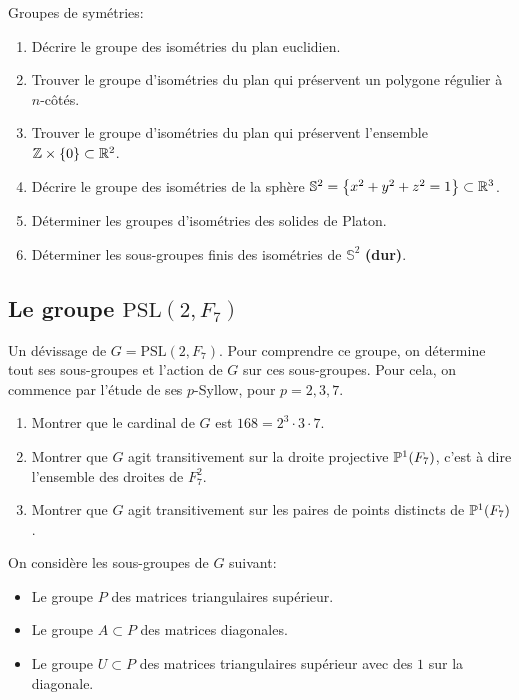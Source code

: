 Groupes de symétries:
\begin{enumerate}
	\item Décrire le groupe des isométries du plan euclidien.
	\item Trouver le groupe d'isométries du plan qui
		préservent un polygone régulier à
		$ n $-côtés.
	\item Trouver le groupe d'isométries du plan qui
		préservent l'ensemble
		$ \mathbb{Z} \times \left\{ 0 \right\} \subset \mathbb{R}^2 $.
	\item Décrire le groupe des isométries de la sphère
		$ \mathbb{S}^{2} =
		\left\{
			x^{2}
			+
			y^{2}
			+
			z^{2}
			=1
		\right\}
		\subset \mathbb{R}^{3} 
		$.
	\item Déterminer les groupes d'isométries
		des solides de Platon.
	\item Déterminer les sous-groupes finis
		des isométries de
		$ \mathbb{S}^{2} $
		\textbf{(dur)}.
\end{enumerate}

\subsection{Le groupe $ \mathrm{PSL}(2, F_7) $ }
\label{sub:psl2f7}

Un dévissage de $ G =  \mathrm{PSL}(2, F_7) $.
Pour comprendre ce groupe, on détermine tout ses
sous-groupes et l'action de $ G $ sur ces sous-groupes.
Pour cela, on commence par l'étude de ses $ p $-Syllow,
pour $ p=2,3,7 $.

\begin{enumerate}
	\item Montrer que le cardinal de $ G $
		est $ 168 = 2^3 \cdot 3 \cdot 7 $.
	\item Montrer que $ G $ agit transitivement sur la droite projective
		$ \mathbb{P}^{1}(F_{7}) $,
		c'est à dire l'ensemble des droites
		de $ F_{7}^{2} $.
	\item Montrer que $ G $ agit transitivement sur les
		paires de points distincts de
		$ \mathbb{P}^{1}(F_{7}) $.
\end{enumerate}

On considère les sous-groupes de $ G $ suivant:
\begin{itemize}
	\item Le groupe $ P $ des matrices triangulaires supérieur.
	\item Le groupe $ A \subset P $ des matrices diagonales.
	\item Le groupe $ U \subset P $ des matrices triangulaires supérieur
		avec des $ 1 $ sur la diagonale.
\end{itemize}

